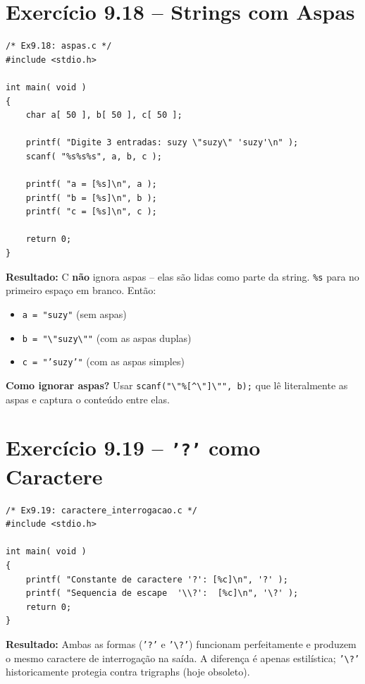 \documentclass[12pt,a4paper]{article}
\begin{document}
\newpage

\section{Exercício 9.18 -- Strings com Aspas}

\begin{respostabox}
\begin{lstlisting}
/* Ex9.18: aspas.c */
#include <stdio.h>

int main( void )
{
    char a[ 50 ], b[ 50 ], c[ 50 ];

    printf( "Digite 3 entradas: suzy \"suzy\" 'suzy'\n" );
    scanf( "%s%s%s", a, b, c );

    printf( "a = [%s]\n", a );
    printf( "b = [%s]\n", b );
    printf( "c = [%s]\n", c );

    return 0;
}
\end{lstlisting}

\textbf{Resultado:} C \textbf{não} ignora aspas -- elas são lidas como parte da
string. \texttt{\%s} para no primeiro espaço em branco. Então:
\begin{itemize}[noitemsep]
  \item \texttt{a = "suzy"} (sem aspas)
  \item \texttt{b = "\textbackslash"suzy\textbackslash""} (com as aspas duplas)
  \item \texttt{c = "'suzy'"} (com as aspas simples)
\end{itemize}

\textbf{Como ignorar aspas?} Usar \texttt{scanf("\textbackslash"\%[\textasciicircum\textbackslash"]\textbackslash"", b);}
que lê literalmente as aspas e captura o conteúdo entre elas.
\end{respostabox}

\section{Exercício 9.19 -- \texttt{'?'} como Caractere}

\begin{respostabox}
\begin{lstlisting}
/* Ex9.19: caractere_interrogacao.c */
#include <stdio.h>

int main( void )
{
    printf( "Constante de caractere '?': [%c]\n", '?' );
    printf( "Sequencia de escape  '\\?':  [%c]\n", '\?' );
    return 0;
}
\end{lstlisting}

\textbf{Resultado:} Ambas as formas (\texttt{'?'} e \texttt{'\textbackslash ?'})
funcionam perfeitamente e produzem o mesmo caractere de interrogação na saída.
A diferença é apenas estilística; \texttt{'\textbackslash ?'} historicamente protegia
contra trigraphs (hoje obsoleto).
\end{respostabox}
\end{document}
